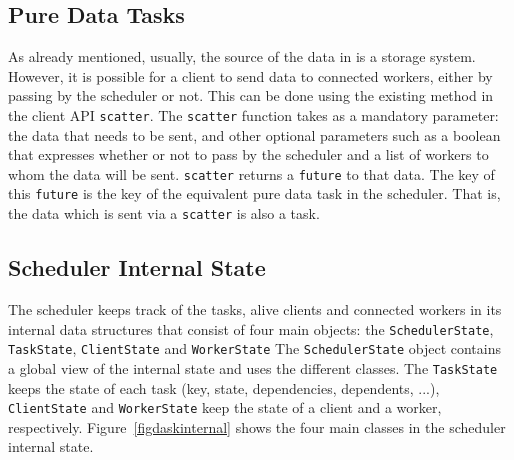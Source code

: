 \subsection{Pure Data Tasks}
As already mentioned, usually, the source of the data in \dask is a storage system. However, it is possible for a client to send data to connected workers, either by passing by the scheduler or not. This can be done using the existing method in the client API \texttt{scatter}. The \texttt{scatter} function takes as a mandatory parameter: the data that needs to be sent, and other optional parameters such as a boolean that expresses whether or not to pass by the scheduler and a list of workers to whom the data will be sent. 
\texttt{scatter} returns a \texttt{future} to that data. The key of this \texttt{future} is the key of the equivalent pure data task in the \dask scheduler. That is, the data which is sent via a \texttt{scatter} is also a task.


\subsection{Scheduler Internal State}

The scheduler keeps track of the tasks, alive clients and connected workers in its internal data structures that consist of four main objects: the \texttt{SchedulerState}, \texttt{TaskState}, \texttt{ClientState} and \texttt{WorkerState}
The \texttt{SchedulerState} object contains a global view of the internal state and uses the different classes. The \texttt{TaskState} keeps the state of each task (key, state, dependencies, dependents, ...), \texttt{ClientState} and \texttt{WorkerState} keep the state of a client and a worker, respectively.
Figure~\ref{figdaskinternal} shows the four main classes in the \dask scheduler internal state. 


